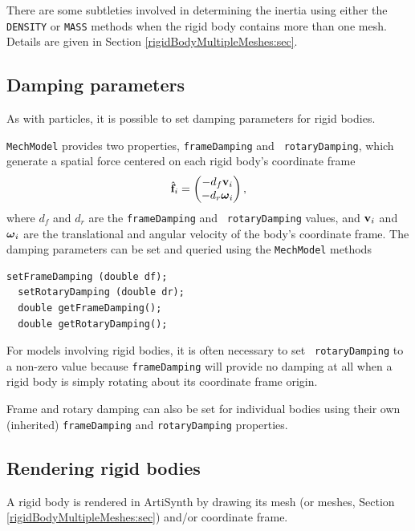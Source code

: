 \begin{sideblock}
There are some subtleties involved in determining the inertia using
either the {\tt DENSITY} or {\tt MASS} methods when the rigid body
contains more than one mesh. Details are given in Section
\ref{rigidBodyMultipleMeshes:sec}.
\end{sideblock}

\subsection{Damping parameters}
\label{RigidBodyDamping:sec}

As with particles, it is possible to set damping parameters for rigid
bodies. 

{\tt MechModel} provides two properties, {\tt frameDamping} and {\tt
rotaryDamping}, which generate a spatial force centered on each rigid
body's coordinate frame
%
\begin{equation}
\hat{{\bf f}}_i = \left(\begin{matrix} -d_f {\bf v}_i \\ -d_r \boldsymbol\omega_i \end{matrix}\right),
\end{equation}
%
where $d_f$ and $d_r$ are the {\tt frameDamping} and {\tt
rotaryDamping} values, and ${\bf v}_i$ and $\boldsymbol\omega_i$ are the translational
and angular velocity of the body's coordinate frame.
The damping parameters can be set and queried using the {\tt MechModel}
methods
%
\begin{lstlisting}[]
  setFrameDamping (double df);
  setRotaryDamping (double dr);
  double getFrameDamping();
  double getRotaryDamping();
\end{lstlisting}
%
\begin{sideblock}
For models involving rigid bodies, it is often necessary to set {\tt
rotaryDamping} to a non-zero value because {\tt frameDamping} will
provide no damping at all when a rigid body is simply rotating about
its coordinate frame origin.
\end{sideblock}

Frame and rotary damping can also be set for individual bodies using
their own (inherited) {\tt frameDamping} and {\tt rotaryDamping}
properties.

\subsection{Rendering rigid bodies}
\label{rigidBodyRendering:sec}

A rigid body is rendered in ArtiSynth by drawing its mesh (or meshes,
Section \ref{rigidBodyMultipleMeshes:sec}) and/or coordinate frame.

